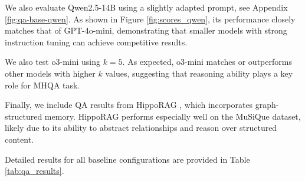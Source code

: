 

\noindent We also evaluate Qwen2.5-14B using a slightly adapted prompt, see Appendix \ref{fig:qa-base-qwen}.  As shown in Figure \ref{fig:scores_qwen}, its performance closely matches that of GPT-4o-mini, demonstrating that smaller models with strong instruction tuning can achieve competitive results.



\noindent We also test o3-mini using $k = 5$. As expected, o3-mini matches or outperforms other models with higher $k$ values, suggesting that reasoning ability plays a key role for MHQA task.

\noindent Finally, we include QA results from HippoRAG \cite{NEURIPS2024_6ddc001d}, which incorporates graph-structured memory. HippoRAG performs especially well on the MuSiQue dataset, likely due to its ability to abstract relationships and reason over structured content.

\noindent Detailed results for all baseline configurations are provided in Table \ref{tab:qa_results}.


